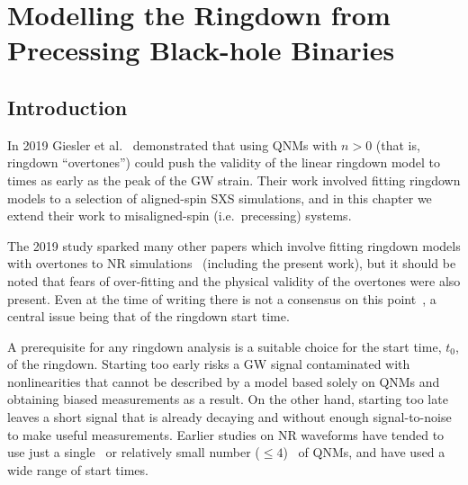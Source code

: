 
\chapter{Modelling the Ringdown from Precessing Black-hole Binaries}
\label{Chapter2}

\section{Introduction}
\label{ch2:sec:introduction}

In 2019 Giesler et al.~\cite{Giesler:2019uxc} demonstrated that using QNMs with $n > 0$ (that is, ringdown ``overtones'') could push the validity of the linear ringdown model to times as early as the peak of the GW strain. 
Their work involved fitting ringdown models to a selection of aligned-spin SXS simulations, and in this chapter we extend their work to misaligned-spin (i.e.\ precessing) systems.

The 2019 study sparked many other papers which involve fitting ringdown models with overtones to NR simulations~\cite{Bhagwat:2019dtm, Ota:2019bzl, JimenezForteza:2020cve, Cook:2020otn, Dhani:2020nik, Mourier:2020mwa, Forteza:2021wfq, MaganaZertuche:2021syq} (including the present work), but it should be noted that fears of over-fitting and the physical validity of the overtones were also present.
Even at the time of writing there is not a consensus on this point~\cite{Baibhav:2023clw, Nee:2023osy}, a central issue being that of the ringdown start time.

A prerequisite for any ringdown analysis is a suitable choice for the start time, $t_0$, of the ringdown. 
Starting too early risks a GW signal contaminated with nonlinearities that cannot be described by a model based solely on QNMs and obtaining biased measurements as a result. 
On the other hand, starting too late leaves a short signal that is already decaying and without enough signal-to-noise to make useful measurements. 
Earlier studies on NR waveforms have tended to use just a single~\cite{Flanagan:1997sx} or relatively small number ($\leq 4$)~\cite{Kamaretsos:2011um, London:2014cma, Carullo:2018sfu, Bhagwat:2017tkm} of QNMs, and have used a wide range of start times. 

